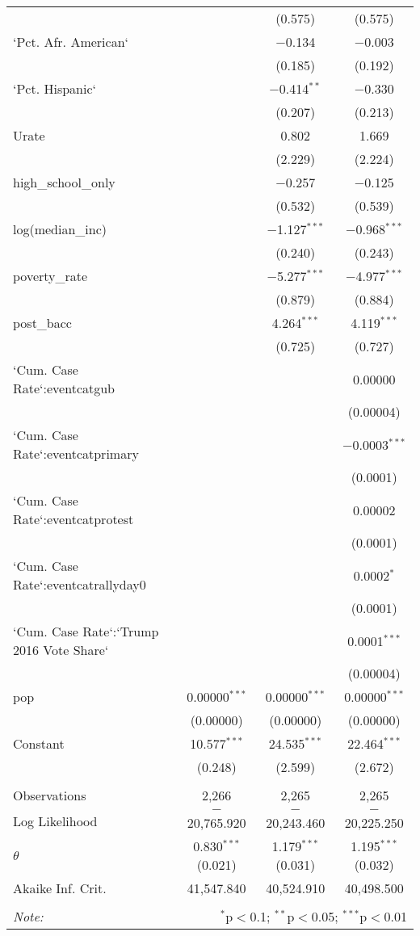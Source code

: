 \begin{table}[!htbp]
\begin{tabular}{@{\extracolsep{5pt}}lccc}
  &  & (0.575) & (0.575) \\ 
  `Pct. Afr. American` &  & $-$0.134 & $-$0.003 \\ 
  &  & (0.185) & (0.192) \\ 
  `Pct. Hispanic` &  & $-$0.414$^{**}$ & $-$0.330 \\ 
  &  & (0.207) & (0.213) \\ 
  Urate &  & 0.802 & 1.669 \\ 
  &  & (2.229) & (2.224) \\ 
  high\_school\_only &  & $-$0.257 & $-$0.125 \\ 
  &  & (0.532) & (0.539) \\ 
  log(median\_inc) &  & $-$1.127$^{***}$ & $-$0.968$^{***}$ \\ 
  &  & (0.240) & (0.243) \\ 
  poverty\_rate &  & $-$5.277$^{***}$ & $-$4.977$^{***}$ \\ 
  &  & (0.879) & (0.884) \\ 
  post\_bacc &  & 4.264$^{***}$ & 4.119$^{***}$ \\ 
  &  & (0.725) & (0.727) \\ 
  `Cum. Case Rate`:eventcatgub &  &  & 0.00000 \\ 
  &  &  & (0.00004) \\ 
  `Cum. Case Rate`:eventcatprimary &  &  & $-$0.0003$^{***}$ \\ 
  &  &  & (0.0001) \\ 
  `Cum. Case Rate`:eventcatprotest &  &  & 0.00002 \\ 
  &  &  & (0.0001) \\ 
  `Cum. Case Rate`:eventcatrallyday0 &  &  & 0.0002$^{*}$ \\ 
  &  &  & (0.0001) \\ 
  `Cum. Case Rate`:`Trump 2016 Vote Share` &  &  & 0.0001$^{***}$ \\ 
  &  &  & (0.00004) \\ 
  pop & 0.00000$^{***}$ & 0.00000$^{***}$ & 0.00000$^{***}$ \\ 
  & (0.00000) & (0.00000) & (0.00000) \\ 
  Constant & 10.577$^{***}$ & 24.535$^{***}$ & 22.464$^{***}$ \\ 
  & (0.248) & (2.599) & (2.672) \\ 
 \hline \\[-1.8ex] 
Observations & 2,266 & 2,265 & 2,265 \\ 
Log Likelihood & $-$20,765.920 & $-$20,243.460 & $-$20,225.250 \\ 
$\theta$ & 0.830$^{***}$  (0.021) & 1.179$^{***}$  (0.031) & 1.195$^{***}$  (0.032) \\ 
Akaike Inf. Crit. & 41,547.840 & 40,524.910 & 40,498.500 \\ 
\hline 
\hline \\[-1.8ex] 
\textit{Note:}  & \multicolumn{3}{r}{$^{*}$p$<$0.1; $^{**}$p$<$0.05; $^{***}$p$<$0.01} \\ 
\end{tabular} 
\end{table} 
